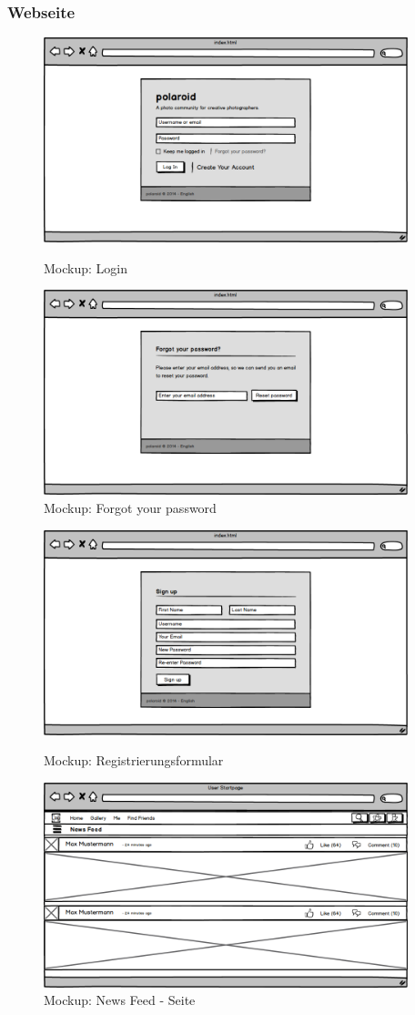\documentclass[a4paper,bibtotoc,oneside]{scrartcl}	%
\begin{document}
		\subsubsection{Webseite}
			\begin{figure}[H]
			\centering
				\includegraphics[width=400px]{Mockups/01_login.jpeg}
				\caption{Mockup: Login} 
				\includegraphics[width=400px]{Mockups/02_password.jpeg}
				\caption{Mockup: Forgot your password}
			\end{figure}
			\begin{figure}[H]
				\includegraphics[width=400px]{Mockups/03_signup.jpeg}
				\caption{Mockup: Registrierungsformular}
				\includegraphics[width=400px]{Mockups/04_startpage.jpeg}
				\caption{Mockup: News Feed - Seite}
			\end{figure}
\end{document}

